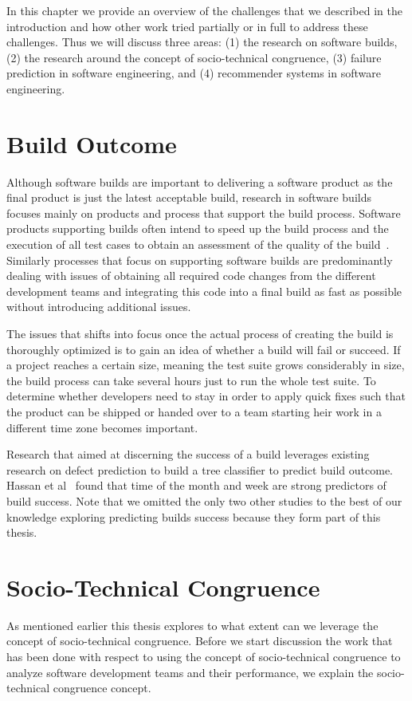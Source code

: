 \label{chap:bg}
In this chapter we provide an overview of the challenges that we described in the introduction and how other work tried partially or in full to address these challenges.
Thus we will discuss three areas: (1) the research on software builds, (2) the research around the concept of socio-technical congruence, (3) failure prediction in software engineering, and (4) recommender systems in software engineering.

\section{Build Outcome}
Although software builds are important to delivering a software product as the final product is just the latest acceptable build, research in software builds focuses mainly on products and process that support the build process.
Software products supporting builds often intend to speed up the build process and the execution of all test cases to obtain an assessment of the quality of the build~\cite{maraia:book:2005}.
Similarly processes that focus on supporting software builds are predominantly dealing with issues of obtaining all required code changes from the different development teams and integrating this code into a final build as fast as possible without introducing additional issues.

The issues that shifts into focus once the actual process of creating the build is thoroughly optimized is to gain an idea of whether a build will fail or succeed.
If a project reaches a certain size, meaning the test suite grows considerably in size, the build process can take several hours just to run the whole test suite.
To determine whether developers need to stay in order to apply quick fixes such that the product can be shipped or handed over to a team starting heir work in a different time zone becomes important.

Research that aimed at discerning the success of a build leverages existing research on defect prediction to build a tree classifier to predict build outcome.
Hassan et al~\cite{hassan:ase:2006} found that time of the month and week are strong predictors of build success.
Note that we omitted the only two other studies to the best of our knowledge exploring predicting builds success because they form part of this thesis.

\section{Socio-Technical Congruence}
As mentioned earlier this thesis explores to what extent can we leverage the concept of socio-technical congruence. 
Before we start discussion the work that has been done with respect to using the concept of socio-technical congruence to analyze software development teams and their performance, we explain the socio-technical congruence concept.

